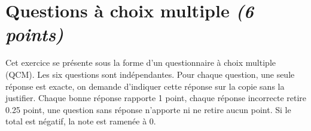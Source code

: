 
\section{Questions à choix multiple \textit{(6 points)}}

Cet exercice se présente sous la forme d'un questionnaire à choix multiple (QCM). Les six questions sont indépendantes. Pour chaque question, une seule réponse est exacte, on demande d'indiquer cette réponse sur la copie sans la justifier. Chaque bonne réponse rapporte 1 point, chaque réponse incorrecte retire \num{0.25} point, une question sans réponse n'apporte ni ne retire aucun point. Si le total est négatif, la note est ramenée à 0.
\vspace*{0.5cm}

